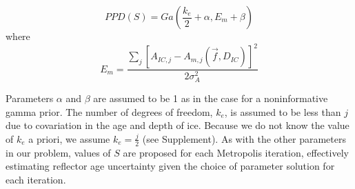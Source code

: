 \begin{equation}\label{eqn:S}
PPD(S) = Ga(\frac{k_e}{2}+\alpha, E_m+\beta)
\end{equation}
where 
\begin{equation}
 E_m= \frac{\sum_{j}[A_{IC,j} - A_{m,j}(\vec{f},D_{IC})]^2}{2\sigma_A^2} 
\end{equation}

Parameters $\alpha$ and $\beta$ are assumed to be 1 as in the case for a noninformative gamma prior. The number of degrees of freedom, $k_e$, is assumed to be less than $j$ due to covariation in the age and depth of ice. Because we do not know the value of $k_e$ a priori, we assume $k_e = \frac{j}{2}$ (see Supplement). As with the other parameters in our problem, values of $S$ are proposed for each Metropolis iteration, effectively estimating reflector age uncertainty given the choice of parameter solution for each iteration.



%

%


